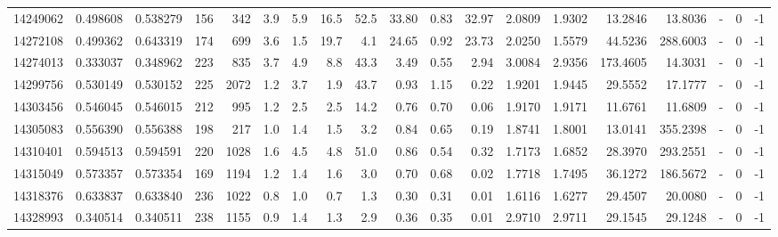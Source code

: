 \begin{tabular}{rrrrrrrrrrrrrrrrlrr}
  14249062 & 0.498608 &   0.538279 &  156 &  342 &      3.9 &      5.9 &    16.5 &     52.5 &      33.80 &        0.83 &       32.97 &  2.0809 &  1.9302 &   13.2846 &   13.8036 &             - &        0 &         -1 \\
  14272108 & 0.499362 &   0.643319 &  174 &  699 &      3.6 &      1.5 &    19.7 &      4.1 &      24.65 &        0.92 &       23.73 &  2.0250 &  1.5579 &   44.5236 &  288.6003 &             - &        0 &         -1 \\
  14274013 & 0.333037 &   0.348962 &  223 &  835 &      3.7 &      4.9 &     8.8 &     43.3 &       3.49 &        0.55 &        2.94 &  3.0084 &  2.9356 &  173.4605 &   14.3031 &             - &        0 &         -1 \\
  14299756 & 0.530149 &   0.530152 &  225 & 2072 &      1.2 &      3.7 &     1.9 &     43.7 &       0.93 &        1.15 &        0.22 &  1.9201 &  1.9445 &   29.5552 &   17.1777 &             - &        0 &         -1 \\
  14303456 & 0.546045 &   0.546015 &  212 &  995 &      1.2 &      2.5 &     2.5 &     14.2 &       0.76 &        0.70 &        0.06 &  1.9170 &  1.9171 &   11.6761 &   11.6809 &             - &        0 &         -1 \\
  14305083 & 0.556390 &   0.556388 &  198 &  217 &      1.0 &      1.4 &     1.5 &      3.2 &       0.84 &        0.65 &        0.19 &  1.8741 &  1.8001 &   13.0141 &  355.2398 &             - &        0 &         -1 \\
  14310401 & 0.594513 &   0.594591 &  220 & 1028 &      1.6 &      4.5 &     4.8 &     51.0 &       0.86 &        0.54 &        0.32 &  1.7173 &  1.6852 &   28.3970 &  293.2551 &             - &        0 &         -1 \\
  14315049 & 0.573357 &   0.573354 &  169 & 1194 &      1.2 &      1.4 &     1.6 &      3.0 &       0.70 &        0.68 &        0.02 &  1.7718 &  1.7495 &   36.1272 &  186.5672 &             - &        0 &         -1 \\
  14318376 & 0.633837 &   0.633840 &  236 & 1022 &      0.8 &      1.0 &     0.7 &      1.3 &       0.30 &        0.31 &        0.01 &  1.6116 &  1.6277 &   29.4507 &   20.0080 &             - &        0 &         -1 \\
  14328993 & 0.340514 &   0.340511 &  238 & 1155 &      0.9 &      1.4 &     1.3 &      2.9 &       0.36 &        0.35 &        0.01 &  2.9710 &  2.9711 &   29.1545 &   29.1248 &             - &        0 &         -1 \\

\end{tabular}
